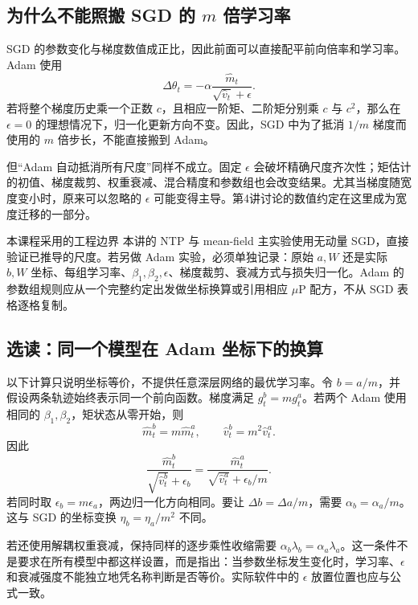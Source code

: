 \subsection{为什么不能照搬 SGD 的 $m$ 倍学习率}

SGD 的参数变化与梯度数值成正比，因此前面可以直接配平前向倍率和学习率。Adam 使用
\[
 \Delta\theta_t=-\alpha\frac{\widehat m_t}{\sqrt{\widehat v_t}+\epsilon}.
\]
若将整个梯度历史乘一个正数 $c$，且相应一阶矩、二阶矩分别乘 $c$ 与 $c^2$，那么在 $\epsilon=0$ 的理想情况下，归一化更新方向不变。因此，SGD 中为了抵消 $1/m$ 梯度而使用的 $m$ 倍步长，不能直接搬到 Adam。

但“Adam 自动抵消所有尺度”同样不成立。固定 $\epsilon$ 会破坏精确尺度齐次性；矩估计的初值、梯度裁剪、权重衰减、混合精度和参数组也会改变结果。尤其当梯度随宽度变小时，原来可以忽略的 $\epsilon$ 可能变得主导。第4讲讨论的数值约定在这里成为宽度迁移的一部分。

\begin{coursebox}{本课程采用的工程边界}
本讲的 NTP 与 mean-field 主实验使用无动量 SGD，直接验证已推导的尺度。若另做 Adam 实验，必须单独记录：原始 $a,W$ 还是实际 $b,W$ 坐标、每组学习率、$\beta_1,\beta_2,\epsilon$、梯度裁剪、衰减方式与损失归一化。Adam 的参数组规则应从一个完整约定出发做坐标换算或引用相应 $\mu$P 配方，不从 SGD 表格逐格复制。
\end{coursebox}

\subsection{选读：同一个模型在 Adam 坐标下的换算}

以下计算只说明坐标等价，不提供任意深层网络的最优学习率。令 $b=a/m$，并假设两条轨迹始终表示同一个前向函数。梯度满足
$g_t^b=mg_t^a$。若两个 Adam 使用相同的 $\beta_1,\beta_2$，矩状态从零开始，则
\[
 \widehat m_t^b=m\widehat m_t^a,
 \qquad
 \widehat v_t^b=m^2\widehat v_t^a.
\]
因此
\begin{equation}
 \frac{\widehat m_t^b}{\sqrt{\widehat v_t^b}+\epsilon_b}
 =\frac{\widehat m_t^a}{\sqrt{\widehat v_t^a}+\epsilon_b/m}.
\end{equation}
若同时取 $\epsilon_b=m\epsilon_a$，两边归一化方向相同。要让
$\Delta b=\Delta a/m$，需要 $\alpha_b=\alpha_a/m$。
这与 SGD 的坐标变换 $\eta_b=\eta_a/m^2$ 不同。

若还使用解耦权重衰减，保持同样的逐步乘性收缩需要
$\alpha_b\lambda_b=\alpha_a\lambda_a$。这一条件不是要求在所有模型中都这样设置，而是指出：当参数坐标发生变化时，学习率、$\epsilon$ 和衰减强度不能独立地凭名称判断是否等价。实际软件中的 $\epsilon$ 放置位置也应与公式一致。

